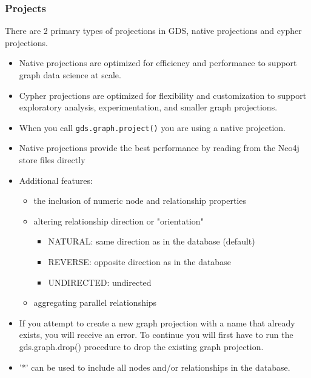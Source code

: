 \begin{frame}[fragile]\frametitle{Projects}

There are 2 primary types of projections in GDS, native projections and cypher projections.

\begin{itemize}
\item Native projections are optimized for efficiency and performance to support graph data science at scale.
\item Cypher projections are optimized for flexibility and customization to support exploratory analysis, experimentation, and smaller graph projections.
\item  When you call \lstinline|gds.graph.project()| you are using a native projection. 
\item Native projections provide the best performance by reading from the Neo4j store files directly
\item Additional features:
	\begin{itemize}
	\item the inclusion of numeric node and relationship properties
	\item altering relationship direction or "orientation"
		\begin{itemize}
			\item NATURAL: same direction as in the database (default)
			\item REVERSE: opposite direction as in the database
			\item UNDIRECTED: undirected
			\end{itemize}

	\item aggregating parallel relationships
	\end{itemize}
\item If you attempt to create a new graph projection with a name that already exists, you will receive an error. To continue you will first have to run the gds.graph.drop() procedure to drop the existing graph projection.
\item '*' can be used to include all nodes and/or relationships in the database.
\end{itemize}

\end{frame}

